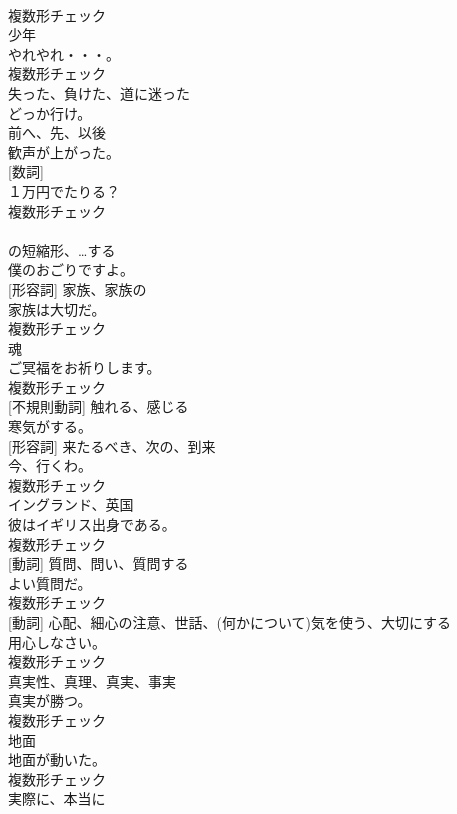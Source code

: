 \documentclass[8pt]{extreport}
\begin{document}
\begin{CJK}{UTF8}{min}
\\	複数形チェック
\\	[名詞]	少年	
\\	やれやれ・・・。	
\\	複数形チェック
\\	[形容詞]	失った、負けた、道に迷った	
\\	どっか行け。	
\\	[副詞]	前へ、先、以後	
\\	歓声が上がった。	
\\	[名詞] [数詞]	
\\	１万円でたりる？	
\\	複数形チェック
\\	[短縮形]	
\\	の短縮形、…する	
\\	僕のおごりですよ。	
\\	[名詞] [形容詞]	家族、家族の	
\\	家族は大切だ。	
\\	複数形チェック
\\	[名詞]	魂	
\\	ご冥福をお祈りします。	
\\	複数形チェック
\\	[動詞] [不規則動詞]	触れる、感じる	
\\	寒気がする。	
\\	[名詞] [形容詞]	来たるべき、次の、到来	
\\	今、行くわ。	
\\	複数形チェック
\\	[名詞]	イングランド、英国	
\\	彼はイギリス出身である。	
\\	複数形チェック
\\	[名詞] [動詞]	質問、問い、質問する	
\\	よい質問だ。	
\\	複数形チェック
\\	[名詞] [動詞]	心配、細心の注意、世話、(何かについて)気を使う、大切にする	
\\	用心しなさい。	
\\	複数形チェック
\\	[名詞]	真実性、真理、真実、事実	
\\	真実が勝つ。	
\\	複数形チェック
\\	[名詞]	地面	
\\	地面が動いた。	
\\	複数形チェック
\\	[副詞]	実際に、本当に	

\end{CJK}
\end{document}
